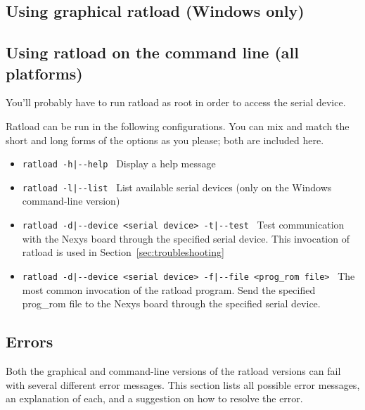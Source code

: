 \documentclass[notitlepage]{article}
\newcommand{\infosign}{\fontencoding{U}\fontfamily{futs}\huge\selectfont\char 116\relax}
\begin{document}
\subsection{Using graphical ratload (Windows only)}

\subsection{Using ratload on the command line (all platforms)}
\begin{infobox}
  {\infosign}You'll probably have to run ratload as root in order to access the serial device.
\end{infobox}
Ratload can be run in the following configurations. You can mix and match the short and long forms of the options as you please; both are included here.
\begin{itemize}
\item \texttt{ratload -h|-{}-help} ~Display a help message
\item \texttt{ratload -l|-{}-list} ~List available serial devices (only on the Windows command-line version)
\item \texttt{ratload -d|-{}-device <serial device> -t|-{}-test} ~Test communication with the Nexys board through the specified serial device. This invocation of ratload is used in Section~\ref{sec:troubleshooting}
\item \texttt{ratload -d|-{}-device <serial device> -f|-{}-file <prog\_rom file>} ~The most common invocation of the ratload program. Send the specified prog\_rom file to the Nexys board through the specified serial device.
\end{itemize}

\subsection{Errors}
Both the graphical and command-line versions of the ratload versions can fail with several different error messages. This section lists all possible error messages, an explanation of each, and a suggestion on how to resolve the error.
\end{document}
